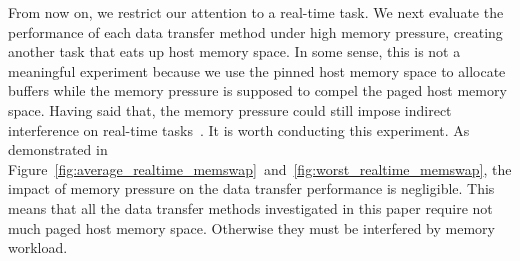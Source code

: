 From now on, we restrict our attention to a real-time task.
We next evaluate the performance of each data transfer method under high
memory pressure, creating another task that eats up host memory space.
In some sense, this is not a meaningful experiment because we use the
pinned host memory space to allocate buffers while the memory pressure
is supposed to compel the paged host memory space.
Having said that, the memory pressure could still impose indirect
interference on real-time tasks~\cite{Kato_RTSJ11, Yang_OSDI08}.
It is worth conducting this experiment.
As demonstrated in
Figure~\ref{fig:average_realtime_memswap}~and~\ref{fig:worst_realtime_memswap},
the impact of memory pressure on the data transfer performance is
negligible.
This means that all the data transfer methods investigated in this paper
require not much paged host memory space.
Otherwise they must be interfered by memory workload.

